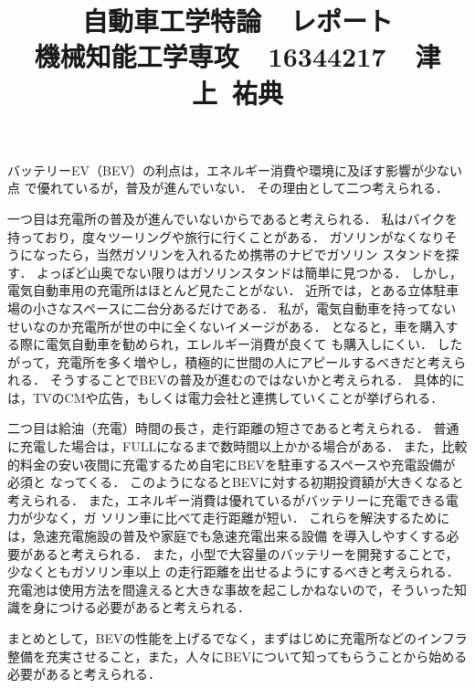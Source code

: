 \documentclass[a4paper,12pt]{jarticle}
\begin{document}
%
\title{\vspace{-30mm}  自動車工学特論~~レポート \\ 機械知能工学専攻~~16344217~~津上~祐典}
\date{}
%
\maketitle
%
\vspace{-20mm}
%
バッテリーEV（BEV）の利点は，エネルギー消費や環境に及ぼす影響が少ない点
で優れているが，普及が進んでいない．
%
その理由として二つ考えられる．

一つ目は充電所の普及が進んでいないからであると考えられる．
%
私はバイクを持っており，度々ツーリングや旅行に行くことがある．
%
ガソリンがなくなりそうになったら，当然ガソリンを入れるため携帯のナビでガソリン
スタンドを探す．
%
よっぽど山奥でない限りはガソリンスタンドは簡単に見つかる．
%
しかし，電気自動車用の充電所はほとんど見たことがない．
%
近所では，とある立体駐車場の小さなスペースに二台分あるだけである．
%
私が，電気自動車を持ってないせいなのか充電所が世の中に全くないイメージがある．
%
となると，車を購入する際に電気自動車を勧められ，エレルギー消費が良くて
も購入しにくい．
%
したがって，充電所を多く増やし，積極的に世間の人にアピールするべきだと考えられる．
%
そうすることでBEVの普及が進むのではないかと考えられる．
%
具体的には，TVのCMや広告，もしくは電力会社と連携していくことが挙げられる．

二つ目は給油（充電）時間の長さ，走行距離の短さであると考えられる．
%
普通に充電した場合は，FULLになるまで数時間以上かかる場合がある．
%
また，比較的料金の安い夜間に充電するため自宅にBEVを駐車するスペースや充電設備が必須と
なってくる．
%
このようになるとBEVに対する初期投資額が大きくなると考えられる．
%
また，エネルギー消費は優れているがバッテリーに充電できる電力が少なく，ガ
ソリン車に比べて走行距離が短い．
%
これらを解決するためには，急速充電施設の普及や家庭でも急速充電出来る設備
を導入しやすくする必要があると考えられる．
%
また，小型で大容量のバッテリーを開発することで，少なくともガソリン車以上
の走行距離を出せるようにするべきと考えられる．
%
充電池は使用方法を間違えると大きな事故を起こしかねないので，そういった知
識を身につける必要があると考えられる．

まとめとして，BEVの性能を上げるでなく，まずはじめに充電所などのインフラ
整備を充実させること，また，人々にBEVについて知ってもらうことから始める
必要があると考えられる．
\end{document}
